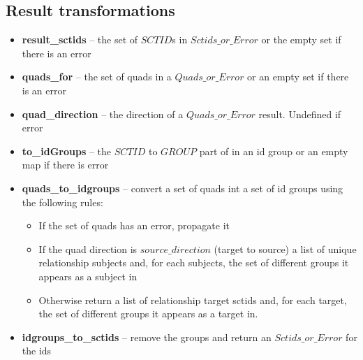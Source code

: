 \documentclass{article}
\begin{document}
\subsection{Result transformations}
\begin{itemize}[noitemsep,nolistsep]
\item \textbf{result\_sctids} -- the set of $SCTID$s in $Sctids\_or\_Error$ or the empty set if there is an error
\item \textbf{quads\_for} -- the set of quads in a $Quads\_or\_Error$ or an empty set if there is an error
\item \textbf{quad\_direction} -- the direction of a $Quads\_or\_Error$ result.  Undefined if error
\item \textbf{to\_idGroups} -- the $SCTID$ to $GROUP$ part of in an id group or an empty map if there is error
\item \textbf{quads\_to\_idgroups} -- convert a set of quads int a set of id groups using the following rules:
\begin{itemize}[noitemsep,nolistsep]
\item If the set of quads has an error, propagate it
\item If the quad direction is $source\_direction$ (target to source) a list of unique relationship subjects and, for each subjects, the set of different groups it appears as a subject in
\item Otherwise return a list of relationship target sctids and, for each target, the set of different groups it appears as a target in.
\end{itemize}
\item \textbf{idgroups\_to\_sctids} -- remove the groups and return an $Sctids\_or\_Error$ for the ids
\end{itemize}
\end{document}
